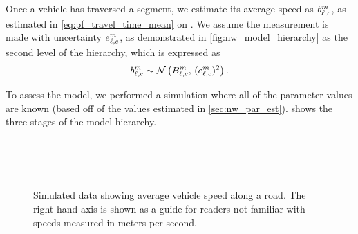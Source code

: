Once a vehicle has traversed a segment, we estimate its average speed as $b_{\ell,c}^m$, as estimated in \cref{eq:pf_travel_time_mean} on . We assume the measurement is made with uncertainty $e_{\ell,c}^m$, as demonstrated in \cref{fig:nw_model_hierarchy} as the second level of the hierarchy, which is expressed as
\begin{equation}\label{eq:nw_tt_obs_dist}
b_{\ell,c}^m \sim \mathcal{N}\left(B_{\ell,c}^m,\, (e_{\ell,c}^m)^2\right).
\end{equation}



To assess the model, we performed a simulation where all of the parameter values are known (based off of the values estimated in \cref{sec:nw_par_est}).  shows the three stages of the model hierarchy.


\begin{knitrout}\small
{}\color{fgcolor}\begin{figure}

{\centering {}\\
\\
\\

}

\caption[Simulated data showing average vehicle speed along a road]{Simulated data showing average vehicle speed along a road. The right hand axis is shown as a guide for readers not familiar with speeds measured in meters per second.}\label{fig:nw_sim_data}
\end{figure}


\end{knitrout}



